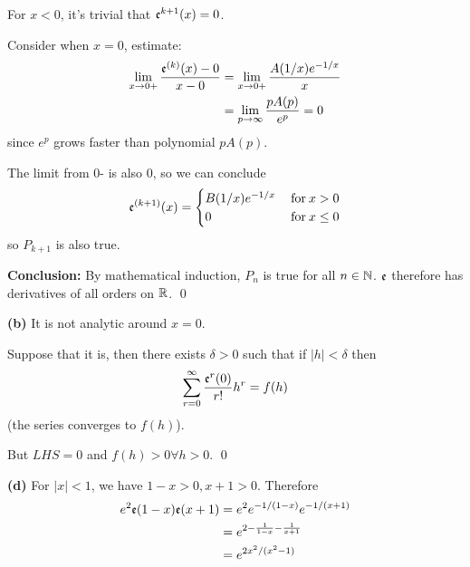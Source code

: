 \documentclass[a4paper, 12pt]{article}
\begin{document}
\begin{solution}
    For $x < 0$, it's trivial that $\mathfrak{e}^{k+1}(x) = 0$.

    Consider when $x = 0$, estimate:
    \begin{align*}
        \lim_{x \to 0+} \frac{\mathfrak{e}^{(k)}(x) - 0}{x - 0} & = \lim_{x \to 0+} \frac{A(1/x)e^{-1/x}}{x} \\
                                                          & =\lim_{p \to \infty}\frac{pA(p)}{e^p} = 0
    \end{align*}
    since $e^p$ grows faster than polynomial $pA(p)$.

    The limit from 0- is also 0, so we can conclude \[
        \mathfrak{e}^{(k+1)}(x) = \begin{cases}
            B(1/x)e^{-1/x} & \:\text{for}\: x > 0    \\
            0              & \:\text{for}\: x \leq 0
        \end{cases}
    \]
    so $P_{k+1}$ is also true.

    \textbf{Conclusion:} By mathematical induction, $P_n$ is true for all $n \in \mathbb{N}$. $\mathfrak{e}$ therefore has derivatives of all orders on $\mathbb{R}$. \qed

    \textbf{(b)} It is not analytic around $x = 0$.

    Suppose that it is, then there exists $\delta > 0$ such that if $|h| < \delta$ then \[
        \sum_{r = 0}^{\infty}\frac{\mathfrak{e}^r(0)}{r!}h^r = f(h)
    \]
    (the series converges to $f(h)$).

    But $LHS = 0$ and $f(h) > 0 \forall h > 0$. \contra \qed

    \textbf{(d)} For $|x| < 1$, we have $1-x > 0, x + 1 > 0$. Therefore \begin{align*}
        e^2\mathfrak{e}(1-x)\mathfrak{e}(x+1) & = e^2 e^{-1/(1-x)} e^{-1/(x+1)}         \\
                                  & = e^{2 - \frac{1}{1-x} - \frac{1}{x+1}} \\
                                  & = e^{2x^2/(x^2-1)}
    \end{align*}
\end{solution}
\end{document}
